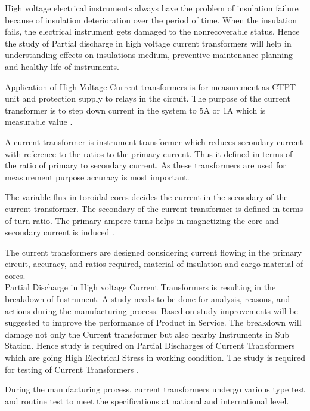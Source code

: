 High voltage electrical instruments always have the problem of insulation failure because of insulation deterioration over the period of time. When the insulation fails, the electrical instrument gets damaged to the nonrecoverable status. Hence the study of Partial discharge in high voltage current transformers will help in understanding effects on insulations medium, preventive maintenance planning and healthy life of instruments. 

Application of High Voltage Current transformers is for measurement as CTPT unit and protection supply to relays in the circuit. The purpose of the current transformer is to step down current in the system to 5A or 1A which is measurable value \cite{karmakar2009monitoring}.

A current transformer is instrument transformer which reduces secondary current with reference to the ratios to the primary current. Thus it defined in terms of the ratio of primary to secondary current. As these transformers are used for measurement purpose accuracy is most important.

The variable flux in toroidal cores decides the current in the secondary of the current transformer. The secondary of the current transformer is defined in terms of turn ratio. The primary ampere turns helps in magnetizing the core and secondary current is induced \cite{kuffel2000high, kreuger1989partial, naiduhigh }.

The current transformers are designed considering current flowing in the primary circuit, accuracy, and ratios required, material of insulation and cargo material of cores.\\

Partial Discharge in High voltage Current Transformers is resulting in the breakdown of Instrument. A study needs to be done for analysis, reasons, and actions during the manufacturing process. Based on study improvements will be suggested to improve the performance of Product in Service. The breakdown will damage not only the Current transformer but also nearby Instruments in Sub Station. Hence study is required on Partial Discharges of Current Transformers which are going High Electrical Stress in working condition. The study is required for testing of Current Transformers  \cite{Proceedingsof2008International}.

During the manufacturing process, current transformers undergo various type test and routine test to meet the specifications at national and international level.

